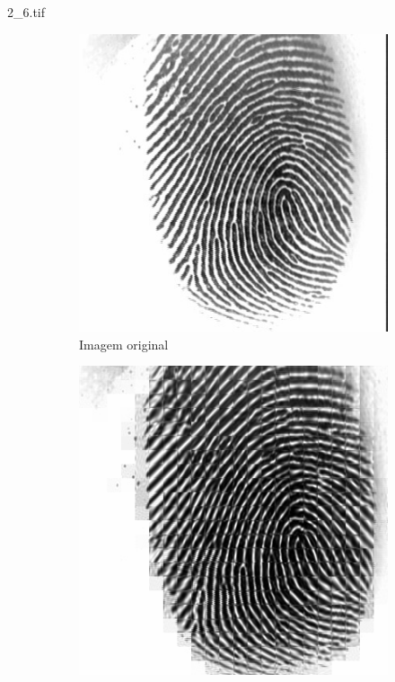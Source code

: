 \documentclass{beamer}
\begin{document}
    \begin{frame}{2\_6.tif}
        \begin{figure}
            \centering
            \begin{subfigure}[!ht]{0.32\textwidth}
                \includegraphics[width=\columnwidth]{Fingerprints/2_6.jpg}
                \caption{Imagem original}
            \end{subfigure}
            \begin{subfigure}[!ht]{0.32\textwidth}
                \includegraphics[width=\columnwidth]{Fingerprints/2_6_intermediate.jpg}

\end{subfigure}
\end{figure}
\end{frame}
\end{document}
